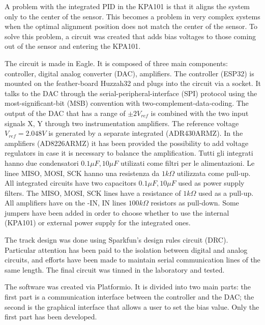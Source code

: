 A problem with the integrated PID in the KPA101 is that it aligns the system only to the center of the sensor. This becomes a problem in very complex systems when the optimal alignment position does not match the center of the sensor.
To solve this problem, a circuit was created that adds bias voltages to those coming out of the sensor and entering the KPA101.

The circuit is made in Eagle. It is composed of three main components: controller, digital analog converter (DAC), amplifiers.
The controller (ESP32) is mounted on the feather-board Huzzah32 and plugs into the circuit via a socket. It talks to the DAC through the serial-peripheral-interface (SPI) protocol using the most-significant-bit (MSB) convention with two-complement-data-coding.
The output of the DAC that has a range of $\pm 2 V_{ref}$ is combined with the two input signals X, Y through two instrumentation amplifiers. The reference voltage $V_{ref} = 2.048V$ is generated by a separate integrated (ADR430ARMZ).
In the amplifiers (AD8226ARMZ) it has been provided the possibility to add voltage regulators in case it is necessary to balance the amplification.
Tutti gli integrati hanno due condensatori $0.1 \mu F, 10 \mu F$ utilizati come filtri per le alimentazioni. Le linee MISO, MOSI, SCK hanno una resistenza da $1 k\Omega$ utilizzata come pull-up.
All integrated circuits have two capacitors $0.1 \mu F, 10 \mu F$ used as power supply filters. The MISO, MOSI, SCK lines have a resistance of $1 k \Omega$ used as a pull-up.
All amplifiers have on the -IN, IN lines $100 k \Omega$ resistors as pull-down. Some jumpers have been added in order to choose whether to use the internal (KPA101) or external power supply for the integrated ones.

The track design was done using Sparkfun’s design rules circuit (DRC). Particular attention has been paid to the isolation between digital and analog circuits, and efforts have been made to maintain serial communication lines of the same length. The final circuit was tinned in the laboratory and tested.

The software was created via Platformio. It is divided into two main parts: the first part is a communication interface between the controller and the DAC; the second is the graphical interface that allows a user to set the bias value. Only the first part has been developed.

